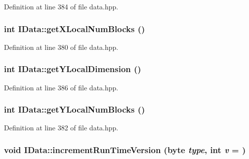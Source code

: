 Definition at line 384 of file data.hpp.\hypertarget{class_i_data_abec8adf5974fa4f9cd543a165a0e2775}{
\subsubsection[{getXLocalNumBlocks}]{\setlength{\rightskip}{0pt plus 5cm}int IData::getXLocalNumBlocks ()}}
\label{class_i_data_abec8adf5974fa4f9cd543a165a0e2775}


Definition at line 380 of file data.hpp.\hypertarget{class_i_data_a50f82afec95e867e638b2f3f23dd68ed}{
\subsubsection[{getYLocalDimension}]{\setlength{\rightskip}{0pt plus 5cm}int IData::getYLocalDimension ()}}
\label{class_i_data_a50f82afec95e867e638b2f3f23dd68ed}


Definition at line 386 of file data.hpp.\hypertarget{class_i_data_ada0ea19f911989ef0fc3f75f2337867d}{
\subsubsection[{getYLocalNumBlocks}]{\setlength{\rightskip}{0pt plus 5cm}int IData::getYLocalNumBlocks ()}}
\label{class_i_data_ada0ea19f911989ef0fc3f75f2337867d}


Definition at line 382 of file data.hpp.\hypertarget{class_i_data_af2d4e7dff291b828c12a41728ed74d4e}{
\subsubsection[{incrementRunTimeVersion}]{\setlength{\rightskip}{0pt plus 5cm}void IData::incrementRunTimeVersion ({\bf byte} {\em type}, \/  int {\em v} = {})}}
\label{class_i_data_af2d4e7dff291b828c12a41728ed74d4e}


